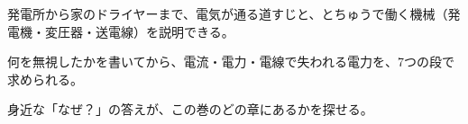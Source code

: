 \begin{furikaeri}
\begin{checklist}
\item 発電所から家のドライヤーまで、電気が通る道すじと、とちゅうで働く機械（発電機・変圧器・送電線）を説明できる。
\item 何を無視したかを書いてから、電流・電力・電線で失われる電力を、7つの段で求められる。
\item 身近な「なぜ？」の答えが、この巻のどの章にあるかを探せる。
\end{checklist}
\end{furikaeri}
